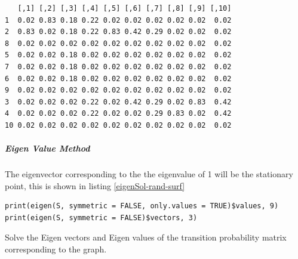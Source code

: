 \documentclass[11pt]{article}
\begin{document}
\begin{verbatim}
   [,1] [,2] [,3] [,4] [,5] [,6] [,7] [,8] [,9] [,10]
1  0.02 0.83 0.18 0.22 0.02 0.02 0.02 0.02 0.02  0.02
2  0.83 0.02 0.18 0.22 0.83 0.42 0.29 0.02 0.02  0.02
8  0.02 0.02 0.02 0.02 0.02 0.02 0.02 0.02 0.02  0.02
5  0.02 0.02 0.18 0.02 0.02 0.02 0.02 0.02 0.02  0.02
7  0.02 0.02 0.18 0.02 0.02 0.02 0.02 0.02 0.02  0.02
6  0.02 0.02 0.18 0.02 0.02 0.02 0.02 0.02 0.02  0.02
9  0.02 0.02 0.02 0.02 0.02 0.02 0.02 0.02 0.02  0.02
3  0.02 0.02 0.02 0.22 0.02 0.42 0.29 0.02 0.83  0.42
4  0.02 0.02 0.02 0.22 0.02 0.02 0.29 0.83 0.02  0.42
10 0.02 0.02 0.02 0.02 0.02 0.02 0.02 0.02 0.02  0.02
\end{verbatim}
\subparagraph{Eigen Value Method}
\label{eigen-value-method}
The eigenvector corresponding to the the eigenvalue of 1 will be the
stationary point, this is shown in listing \ref{eigenSol-rand-surf}

\begin{listing}[htbp]
\begin{verbatim}
print(eigen(S, symmetric = FALSE, only.values = TRUE)$values, 9)
print(eigen(S, symmetric = FALSE)$vectors, 3)
\end{verbatim}
\caption{\label{eigenSol-rand-surf}Solve the Eigen vectors and Eigen values of the transition probability matrix corresponding to the graph.}
\end{listing}
\end{document}
